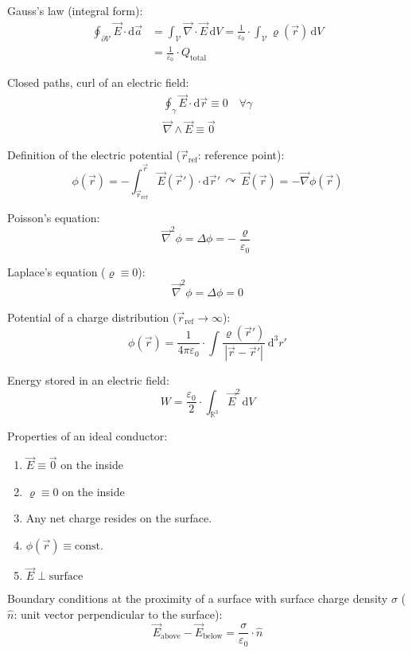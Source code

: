 \documentclass[fontsize=11pt,a4paper]{scrartcl}
\begin{document}
Gauss's law (integral form):
\begin{equation*}
\begin{split}
	\oint_{\partial\mathcal{V}}\vec E\cdot\mathrm{d}\vec a &= \int_\mathcal{V}\vec\nabla\cdot\vec E\,\mathrm{d}V = \frac{1}{\varepsilon_0}\cdot\int_\mathcal{V}\varrho(\vec r)\,\mathrm{d}V\\
	                                              &= \frac{1}{\varepsilon_0}\cdot Q_\mathrm{total}
\end{split}
\end{equation*}

Closed paths, curl of an electric field:
\begin{gather*}
		\oint_\gamma\vec E\cdot\mathrm{d}\vec r\equiv 0\quad\forall\gamma\\
		\vec\nabla\wedge\vec E\equiv\vec 0
\end{gather*}

Definition of the electric potential ($\vec r_\mathrm{ref}$: reference point):
\begin{equation*}
	\phi(\vec r)=-\int_{\vec r_\mathrm{ref}}^{\vec r}\vec E(\vec r')\cdot\mathrm{d}\vec r'\,\curvearrowright\,\vec E(\vec r)=-\vec\nabla\phi(\vec r)
\end{equation*}

Poisson's equation:
\[
	\vec\nabla^2\phi=\Delta\phi=-\frac{\varrho}{\varepsilon_0}
\]

Laplace's equation ($\varrho\equiv 0$):
\[
	\vec\nabla^2\phi=\Delta\phi=0
\]

Potential of a charge distribution ($\vec r_\mathrm{ref}\to\infty$):
\[
	\phi(\vec r)=\frac{1}{4\pi\varepsilon_0}\cdot\int\frac{\varrho(\vec r')}{|\vec r-\vec r'|}\,\mathrm{d}^3 r'
\]

Energy stored in an electric field:
\[
	W=\frac{\varepsilon_0}{2}\cdot\int_{\mathbb{R}^3}\vec E^2\,\mathrm{d}V
\]

Properties of an ideal conductor:
\begin{enumerate}
	\item $\vec E\equiv\vec 0$ on the inside
	\item $\varrho\equiv 0$ on the inside
	\item Any net charge resides on the surface.
	\item $\phi(\vec r)\equiv\text{const.}$
	\item $\vec E\perp \text{surface}$
\end{enumerate}

Boundary conditions at the proximity of a surface with surface charge density $\sigma$ ($\hat n$: unit vector perpendicular to the surface):
\[
	\vec E_\mathrm{above}-\vec E_\mathrm{below}=\frac{\sigma}{\varepsilon_0}\cdot\hat n
\]
\end{document}

